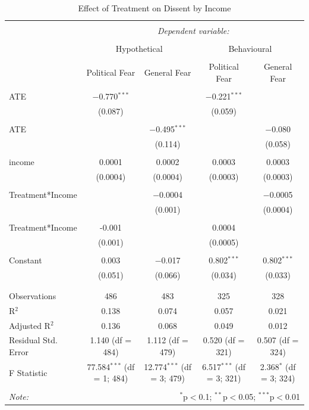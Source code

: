 \documentclass{article}
\begin{document}
\setlength{\tabcolsep}{0.3pt}
\begin{table}[!htbp] \centering 
  \caption{Effect of Treatment on Dissent by Income} 
  \label{} 
\begin{tabular}{@{\extracolsep{5pt}}lcccc} 
\\[-1.8ex]\hline 
\hline \\[-1.8ex] 
 & \multicolumn{4}{c}{\textit{Dependent variable:}} \\ 
\cline{2-5} 
\\[-1.8ex] & \multicolumn{2}{c}{Hypothetical} & \multicolumn{2}{c}{Behavioural} \\ 
\\[-1.8ex] & Political Fear & General Fear & Political Fear & General Fear\\ 
\hline \\[-1.8ex] 
 ATE & $-$0.770$^{***}$ &  & $-$0.221$^{***}$ &  \\ 
  & (0.087) &  & (0.059) &  \\ 
  & & & & \\ 
 ATE &  & $-$0.495$^{***}$ &  & $-$0.080 \\ 
  &  & (0.114) &  & (0.058) \\ 
  & & & & \\ 
 income & 0.0001  & 0.0002 & 0.0003 & 0.0003 \\ 
  & (0.0004) & (0.0004) & (0.0003) & (0.0003) \\ 
  & & & & \\ 
 Treatment*Income &  & $-$0.0004 &  & $-$0.0005 \\ 
  &  & (0.001) &  & (0.0004) \\ 
  & & & & \\ 
Treatment*Income &-0.001  &  & 0.0004 &  \\ 
  & (0.001) &  & (0.0005) &  \\ 
  & & & & \\ 
 Constant & 0.003 & $-$0.017 & 0.802$^{***}$ & 0.802$^{***}$ \\ 
  & (0.051) & (0.066) & (0.034) & (0.033) \\ 
  & & & & \\ 
\hline \\[-1.8ex] 
Observations & 486 & 483 & 325 & 328 \\ 
R$^{2}$ & 0.138 & 0.074 & 0.057 & 0.021 \\ 
Adjusted R$^{2}$ & 0.136 & 0.068 & 0.049 & 0.012 \\ 
Residual Std. Error & 1.140 (df = 484) & 1.112 (df = 479) & 0.520 (df = 321) & 0.507 (df = 324) \\ 
F Statistic & 77.584$^{***}$ (df = 1; 484) & 12.774$^{***}$ (df = 3; 479) & 6.517$^{***}$ (df = 3; 321) & 2.368$^{*}$ (df = 3; 324) \\ 
\hline 
\hline \\[-1.8ex] 
\textit{Note:}  & \multicolumn{4}{r}{$^{*}$p$<$0.1; $^{**}$p$<$0.05; $^{***}$p$<$0.01} \\ 
\end{tabular} 
\end{table} 
\end{document}

